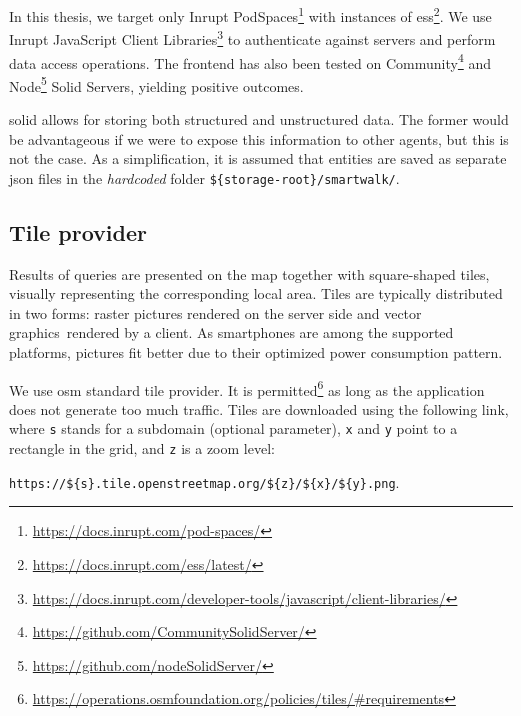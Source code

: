 In this thesis, we target only Inrupt PodSpaces\footnote{\href{https://docs.inrupt.com/pod-spaces/}{https://docs.inrupt.com/pod-spaces/}} with instances of \ac{ess}\footnote{\href{https://docs.inrupt.com/ess/latest/}{https://docs.inrupt.com/ess/latest/}}. We use Inrupt JavaScript Client Libraries\footnote{\href{https://docs.inrupt.com/developer-tools/javascript/client-libraries/}{https://docs.inrupt.com/developer-tools/javascript/client-libraries/}} to authenticate against servers and perform data access operations. The frontend has also been tested on Community\footnote{\href{https://github.com/CommunitySolidServer/}{https://github.com/CommunitySolidServer/}} and Node\footnote{\href{https://github.com/nodeSolidServer/}{https://github.com/nodeSolidServer/}} Solid Servers, yielding positive outcomes.

\acs{solid} allows for storing both structured and unstructured data. The former would be advantageous if we were to expose this information to other agents, but this is not the case. As a simplification, it is assumed that entities are saved as separate \acs{json} files in the \emph{hardcoded} folder \texttt{\$\{storage-root\}/smartwalk/}.

\subsection{Tile provider}\label{ssec:tile-provider}

Results of queries are presented on the map together with square-shaped tiles, visually representing the corresponding local area. Tiles are typically distributed in two forms: raster pictures rendered on the server side and vector graphics~ren\-dered by a client. As smartphones are among the supported platforms, pictures fit better due to their optimized power consumption pattern.

We use \acs{osm} standard tile provider. It is permitted\footnote{\href{https://operations.osmfoundation.org/policies/tiles/\#requirements}{https://operations.osmfoundation.org/policies/tiles/\#requirements}} as long as the application does not generate too much traffic. Tiles are downloaded using the following link, where \texttt{s} stands for a subdomain (optional parameter), \texttt{x} and \texttt{y} point to a rectangle in the grid, and \texttt{z} is a zoom level:

\begin{center}
\texttt{https://\$\{s\}.tile.openstreetmap.org/\$\{z\}/\$\{x\}/\$\{y\}.png}.
\end{center}

